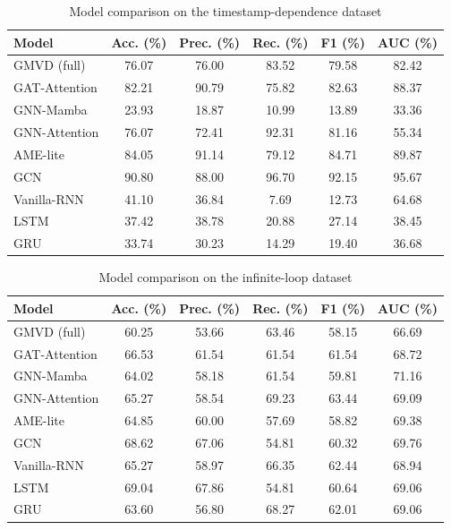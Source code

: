 \documentclass[12pt, a4paper, openright, twoside]{report}
\begin{document}
\begin{table}[htbp]
\centering
\caption{Model comparison on the timestamp-dependence dataset}
\label{tab:results_timestamp}
\begin{tabular}{|l|c|c|c|c|c|}
\hline
\textbf{Model} & \textbf{Acc. (\%)} & \textbf{Prec. (\%)} & \textbf{Rec. (\%)} & \textbf{F1 (\%)} & \textbf{AUC (\%)} \\ \hline
GMVD (full)     & 76.07 & 76.00 & 83.52 & 79.58 & 82.42 \\ \hline
GAT-Attention   & 82.21 & 90.79 & 75.82 & 82.63 & 88.37 \\ \hline
GNN-Mamba       & 23.93 & 18.87 & 10.99 & 13.89 & 33.36 \\ \hline
GNN-Attention   & 76.07 & 72.41 & 92.31 & 81.16 & 55.34 \\ \hline
AME-lite        & 84.05 & 91.14 & 79.12 & 84.71 & 89.87 \\ \hline
GCN             & 90.80 & 88.00 & 96.70 & 92.15 & 95.67 \\ \hline
Vanilla-RNN     & 41.10 & 36.84 & 7.69  & 12.73 & 64.68 \\ \hline
LSTM            & 37.42 & 38.78 & 20.88 & 27.14 & 38.45 \\ \hline
GRU             & 33.74 & 30.23 & 14.29 & 19.40 & 36.68 \\ \hline
\end{tabular}
\end{table}

\begin{table}[htbp]
\centering
\caption{Model comparison on the infinite-loop dataset}
\label{tab:results_loop}
\begin{tabular}{|l|c|c|c|c|c|}
\hline
\textbf{Model} & \textbf{Acc. (\%)} & \textbf{Prec. (\%)} & \textbf{Rec. (\%)} & \textbf{F1 (\%)} & \textbf{AUC (\%)} \\ \hline
GMVD (full)     & 60.25 & 53.66 & 63.46 & 58.15 & 66.69 \\ \hline
GAT-Attention   & 66.53 & 61.54 & 61.54 & 61.54 & 68.72 \\ \hline
GNN-Mamba       & 64.02 & 58.18 & 61.54 & 59.81 & 71.16 \\ \hline
GNN-Attention   & 65.27 & 58.54 & 69.23 & 63.44 & 69.09 \\ \hline
AME-lite        & 64.85 & 60.00 & 57.69 & 58.82 & 69.38 \\ \hline
GCN             & 68.62 & 67.06 & 54.81 & 60.32 & 69.76 \\ \hline
Vanilla-RNN     & 65.27 & 58.97 & 66.35 & 62.44 & 68.94 \\ \hline
LSTM            & 69.04 & 67.86 & 54.81 & 60.64 & 69.06 \\ \hline
GRU             & 63.60 & 56.80 & 68.27 & 62.01 & 69.06 \\ \hline
\end{tabular}
\end{table}
\end{document}
